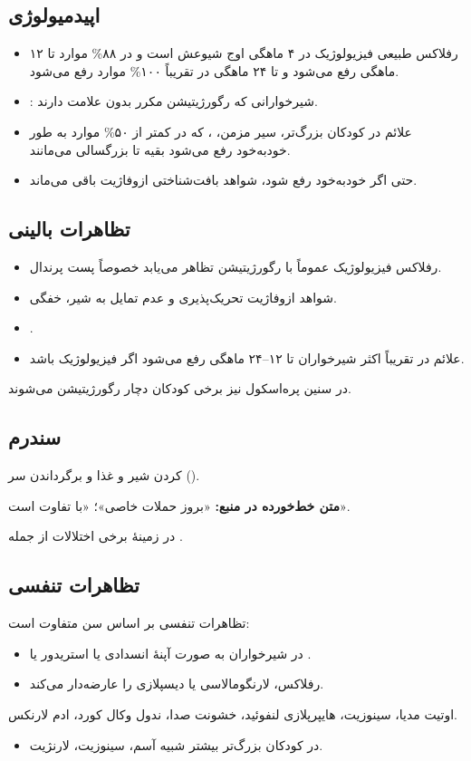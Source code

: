 \documentclass[12pt,a4paper]{article}
\begin{document}
\subsection*{اپیدمیولوژی}
\begin{itemize}
\item رفلاکس طبیعی فیزیولوژیک در ۴ ماهگی اوج شیوعش است و در ۸۸\% موارد تا ۱۲ ماهگی رفع می‌شود و تا ۲۴ ماهگی در تقریباً ۱۰۰\% موارد رفع می‌شود.
\item {}: شیرخوارانی که رگورژیتیشن مکرر بدون علامت دارند.
\item علائم  در کودکان بزرگ‌تر، سیر مزمن، ، که در کمتر از ۵۰\% موارد به طور خودبه‌خود رفع می‌شود \GERDArrow{} بقیه تا بزرگسالی می‌مانند.
\item حتی اگر خودبه‌خود رفع شود، شواهد بافت‌شناختی ازوفاژیت باقی می‌ماند.
\end{itemize}

\subsection*{تظاهرات بالینی}
\begin{itemize}
\item رفلاکس فیزیولوژیک عموماً با رگورژیتیشن تظاهر می‌یابد \GERDArrow{} خصوصاً پست پرندال.
\item شواهد ازوفاژیت \GERDArrow{} تحریک‌پذیری و عدم تمایل به شیر، خفگی.
\item {}.
\item علائم در تقریباً اکثر شیرخواران تا ۱۲–۲۴ ماهگی رفع می‌شود \GERDArrow{} اگر فیزیولوژیک باشد.
\end{itemize}
در سنین پره‌اسکول نیز برخی کودکان دچار رگورژیتیشن می‌شوند.

\subsection*{سندرم }
 کردن شیر و غذا و برگرداندن سر ().

\textbf{متن خط‌خورده در منبع:} «بروز حملات خاصی»؛ «با  تفاوت است».

در زمینهٔ برخی اختلالات از جمله .

\subsection*{تظاهرات تنفسی }
تظاهرات تنفسی  بر اساس سن متفاوت است:
\begin{itemize}
\item در شیرخواران به صورت آپنهٔ انسدادی یا استریدور یا .
\item رفلاکس، لارنگومالاسی یا دیسپلازی  را عارضه‌دار می‌کند.
\end{itemize}
اوتیت مدیا، سینوزیت، هایپرپلازی لنفوئید، خشونت صدا، ندول وکال کورد، ادم لارنکس.
\begin{itemize}
\item در کودکان بزرگ‌تر بیشتر شبیه آسم، سینوزیت، لارنژیت.
\end{itemize}
\end{document}
